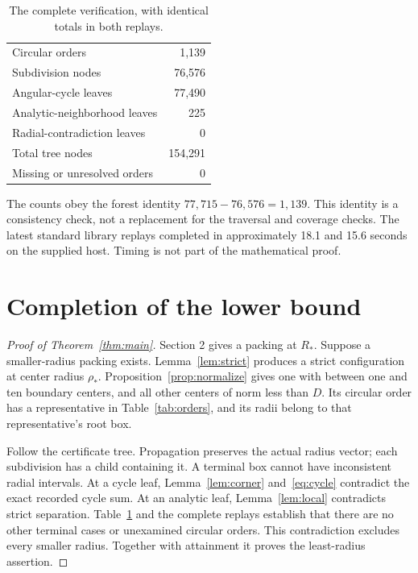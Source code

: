 \documentclass[11pt]{amsart}
\theoremstyle{definition}
\theoremstyle{remark}
\numberwithin{equation}{section}
\newcommand{\rhoopt}{\rho_*}
\newcommand{\Ropt}{R_*}
\begin{document}
\begin{table}[ht]
\centering
\caption{The complete verification, with identical totals in both replays.}
\begin{tabular}{@{}lr@{}}
\toprule
Circular orders&1,139\\
Subdivision nodes&76,576\\
Angular-cycle leaves&77,490\\
Analytic-neighborhood leaves&225\\
Radial-contradiction leaves&0\\
Total tree nodes&154,291\\
Missing or unresolved orders&0\\
\bottomrule
\end{tabular}
\label{tab:verification}
\end{table}

The counts obey the forest identity
$77{,}715-76{,}576=1{,}139$. This identity is a consistency check, not a
replacement for the traversal and coverage checks. The latest standard
library replays completed in approximately 18.1 and 15.6 seconds on the
supplied host. Timing is not part of the mathematical proof.

\section{Completion of the lower bound}

\begin{proof}[Proof of Theorem~\ref{thm:main}]
Section 2 gives a packing at $\Ropt$. Suppose a smaller-radius packing
exists. Lemma~\ref{lem:strict} produces a strict configuration at center
radius $\rhoopt$. Proposition~\ref{prop:normalize} gives one with between
one and ten boundary centers, and all other centers of norm less than $D$.
Its circular order has a representative in Table~\ref{tab:orders}, and
its radii belong to that representative's root box.

Follow the certificate tree. Propagation preserves the actual radius vector;
each subdivision has a child containing it. A terminal box cannot have
inconsistent radial intervals. At a cycle leaf, Lemma~\ref{lem:corner}
and~\eqref{eq:cycle} contradict the exact recorded cycle sum. At an analytic
leaf, Lemma~\ref{lem:local} contradicts strict separation. Table~\ref{tab:verification}
and the complete replays establish that there are no other terminal cases
or unexamined circular orders. This contradiction excludes every smaller
radius. Together with attainment it proves the least-radius assertion.
\end{proof}
\end{document}
